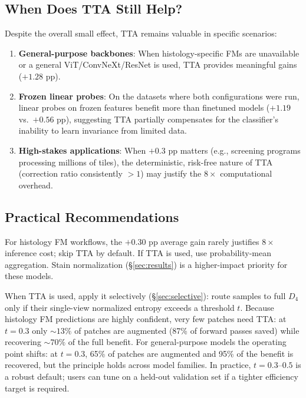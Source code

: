 \documentclass{melba}
\begin{document}
\subsection{When Does TTA Still Help?}

Despite the overall small effect, TTA remains valuable in specific scenarios:

\begin{enumerate}
  \item \textbf{General-purpose backbones}: When histology-specific FMs are unavailable or a general ViT/ConvNeXt/ResNet is used, TTA provides meaningful gains ($+1.28$ pp).
  \item \textbf{Frozen linear probes}: On the datasets where both configurations were run, linear probes on frozen features benefit more than finetuned models ($+1.19$ vs.\ $+0.56$ pp), suggesting TTA partially compensates for the classifier's inability to learn invariance from limited data.
  \item \textbf{High-stakes applications}: When $+0.3$ pp matters (e.g., screening programs processing millions of tiles), the deterministic, risk-free nature of TTA (correction ratio consistently $>1$) may justify the $8\times$ computational overhead.
\end{enumerate}


\subsection{Practical Recommendations}

For histology FM workflows, the $+0.30$ pp average gain rarely justifies $8\times$ inference cost; skip TTA by default. If TTA is used, use probability-mean aggregation. Stain normalization (\S\ref{sec:results}) is a higher-impact priority for these models.

When TTA is used, apply it selectively (\S\ref{sec:selective}): route samples to full $D_4$ only if their single-view normalized entropy exceeds a threshold $t$. Because histology FM predictions are highly confident, very few patches need TTA: at $t = 0.3$ only ${\sim}13\%$ of patches are augmented (87\% of forward passes saved) while recovering ${\sim}70\%$ of the full benefit. For general-purpose models the operating point shifts: at $t = 0.3$, 65\% of patches are augmented and 95\% of the benefit is recovered, but the principle holds across model families. In practice, $t = 0.3$--$0.5$ is a robust default; users can tune on a held-out validation set if a tighter efficiency target is required.
\end{document}
